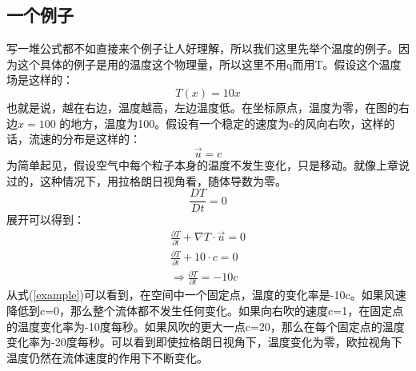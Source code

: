 \documentclass{article}
\begin{document}
\subsection{一个例子}
写一堆公式都不如直接来个例子让人好理解，所以我们这里先举个温度的例子。因为这个具体的例子是用的温度这个物理量，所以这里不用q而用T。假设这个温度场是这样的：
\begin{equation}
T(x)=10x
\end{equation}
也就是说，越在右边，温度越高，左边温度低。在坐标原点，温度为零，在图的右边$x=100$ 的地方，温度为100。假设有一个稳定的速度为c的风向右吹，这样的话，流速的分布是这样的：
\begin{equation}
\vec{u}=c
\end{equation}
为简单起见，假设空气中每个粒子本身的温度不发生变化，只是移动。就像上章说过的，这种情况下，用拉格朗日视角看，随体导数为零。
\begin{equation}
\frac{DT}{Dt}=0
\end{equation}
展开可以得到：
\begin{equation}
\begin{aligned}
\frac{\partial{T}}{\partial{t}}+\nabla{T}\cdot\vec{u}=0 \\
\frac{\partial{T}}{\partial{t}}+10\cdot{c}=0 \\
\Rightarrow \frac{\partial{T}}{\partial{t}}=-10c \label{example}
\end{aligned}
\end{equation}
从式(\ref{example})可以看到，在空间中一个固定点，温度的变化率是-10c。如果风速降低到c=0，那么整个流体都不发生任何变化。如果向右吹的速度c=1，在固定点的温度变化率为-10度每秒。如果风吹的更大一点c=20，那么在每个固定点的温度变化率为-20度每秒。可以看到即使拉格朗日视角下，温度变化为零，欧拉视角下温度仍然在流体速度的作用下不断变化。
\end{document}
